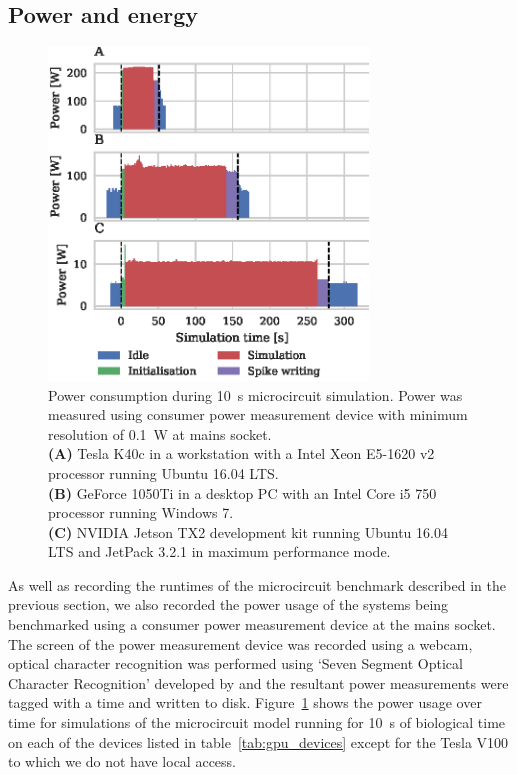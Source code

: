 \documentclass[utf8]{frontiersSCNS} %
\begin{document}
\subsection{Power and energy}
\label{sec:results/power}
\begin{figure}
    \begin{center}
        \includegraphics[width=85mm]{figures/microcircuit_power}
    \end{center}
    \caption{Power consumption during \SI{10}{\second} microcircuit simulation.
    Power was measured using consumer power measurement device with minimum resolution of \SI{0.1}{\watt} at mains socket.\\
    \textbf{(A)} Tesla K40c in a workstation with a Intel Xeon E5-1620 v2 processor running Ubuntu 16.04 LTS.\\
    \textbf{(B)} GeForce 1050Ti in a desktop PC with an Intel Core i5 750 processor running Windows 7.\\
    \textbf{(C)} NVIDIA Jetson TX2 development kit running Ubuntu 16.04 LTS and JetPack 3.2.1 in maximum performance mode.}
    \label{fig:microcircuit_power}
\end{figure}

As well as recording the runtimes of the microcircuit benchmark described in the previous section, we also recorded the power usage of the systems being benchmarked using a consumer power measurement device at the mains socket.
The screen of the power measurement device was recorded using a webcam, optical character recognition was performed using `Seven Segment Optical Character Recognition' developed by \citet{Auerswald2018} and the resultant power measurements were tagged with a time and written to disk.
Figure~\ref{fig:microcircuit_power} shows the power usage over time for simulations of the microcircuit model running for \SI{10}{\second} of biological time on each of the devices listed in table~\ref{tab:gpu_devices} except for the Tesla V100 to which we do not have local access.
\end{document}
